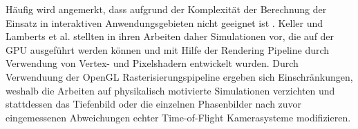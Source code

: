 \documentclass[thesis.tex]{subfiles}
\begin{document}
Häufig wird angemerkt, dass aufgrund der Komplexität der Berechnung der Einsatz in interaktiven Anwendungsgebieten nicht geeignet ist \cite{bib:Hertzberg2014}\cite{bib:Lambers2015}. Keller \cite{bib:Keller2015} und Lamberts et al. \cite{bib:Lambers2015} stellten in ihren Arbeiten daher Simulationen vor, die auf der GPU ausgeführt werden können und mit Hilfe der Rendering Pipeline durch Verwendung von Vertex- und Pixelshadern entwickelt wurden. Durch Verwenduung der OpenGL Rasterisierungspipeline ergeben sich Einschränkungen, weshalb die Arbeiten auf physikalisch motivierte Simulationen verzichten und stattdessen das Tiefenbild oder die einzelnen Phasenbilder nach zuvor eingemessenen Abweichungen echter Time-of-Flight Kamerasysteme modifizieren.

\subfilebib %
\end{document}

